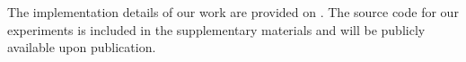 {The implementation details of our work are provided on }. The source code for our experiments is included in the supplementary materials and will be publicly available upon publication.




